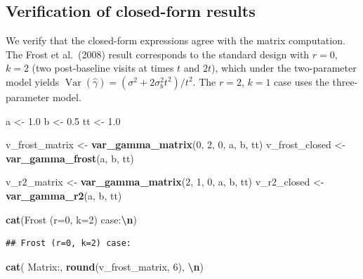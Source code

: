 \documentclass[
]{article}
\newenvironment{Shaded}{\begin{snugshade}}{\end{snugshade}}
\newcommand{\DecValTok}[1]{\textcolor[rgb]{0.00,0.00,0.81}{#1}}
\newcommand{\FloatTok}[1]{\textcolor[rgb]{0.00,0.00,0.81}{#1}}
\newcommand{\FunctionTok}[1]{\textcolor[rgb]{0.13,0.29,0.53}{\textbf{#1}}}
\newcommand{\NormalTok}[1]{#1}
\newcommand{\OtherTok}[1]{\textcolor[rgb]{0.56,0.35,0.01}{#1}}
\newcommand{\SpecialCharTok}[1]{\textcolor[rgb]{0.81,0.36,0.00}{\textbf{#1}}}
\newcommand{\StringTok}[1]{\textcolor[rgb]{0.31,0.60,0.02}{#1}}
\begin{document}
\subsection{Verification of closed-form
results}\label{verification-of-closed-form-results}

We verify that the closed-form expressions agree with the matrix
computation. The Frost et al.~(2008) result corresponds to the standard
design with \(r=0\), \(k=2\) (two post-baseline visits at times \(t\)
and \(2t\)), which under the two-parameter model yields
\(\mathop{\mathrm{Var}}(\hat{\gamma}) = (\sigma^2 + 2\sigma_b^2 t^2)/t^2\).
The \(r=2\), \(k=1\) case uses the three-parameter model.

\begin{Shaded}
\begin{Highlighting}[]
\NormalTok{a }\OtherTok{\textless{}{-}} \FloatTok{1.0}
\NormalTok{b }\OtherTok{\textless{}{-}} \FloatTok{0.5}
\NormalTok{tt }\OtherTok{\textless{}{-}} \FloatTok{1.0}

\NormalTok{v\_frost\_matrix }\OtherTok{\textless{}{-}} \FunctionTok{var\_gamma\_matrix}\NormalTok{(}\DecValTok{0}\NormalTok{, }\DecValTok{2}\NormalTok{, }\DecValTok{0}\NormalTok{, a, b, tt)}
\NormalTok{v\_frost\_closed }\OtherTok{\textless{}{-}} \FunctionTok{var\_gamma\_frost}\NormalTok{(a, b, tt)}

\NormalTok{v\_r2\_matrix }\OtherTok{\textless{}{-}} \FunctionTok{var\_gamma\_matrix}\NormalTok{(}\DecValTok{2}\NormalTok{, }\DecValTok{1}\NormalTok{, }\DecValTok{0}\NormalTok{, a, b, tt)}
\NormalTok{v\_r2\_closed }\OtherTok{\textless{}{-}} \FunctionTok{var\_gamma\_r2}\NormalTok{(a, b, tt)}

\FunctionTok{cat}\NormalTok{(}\StringTok{\textquotesingle{}Frost (r=0, k=2) case:}\SpecialCharTok{\textbackslash{}n}\StringTok{\textquotesingle{}}\NormalTok{)}
\end{Highlighting}
\end{Shaded}

\begin{verbatim}
## Frost (r=0, k=2) case:
\end{verbatim}

\begin{Shaded}
\begin{Highlighting}[]
\FunctionTok{cat}\NormalTok{(}\StringTok{\textquotesingle{}  Matrix:\textquotesingle{}}\NormalTok{, }\FunctionTok{round}\NormalTok{(v\_frost\_matrix, }\DecValTok{6}\NormalTok{), }\StringTok{\textquotesingle{}}\SpecialCharTok{\textbackslash{}n}\StringTok{\textquotesingle{}}\NormalTok{)}
\end{Highlighting}
\end{Shaded}
\end{document}
